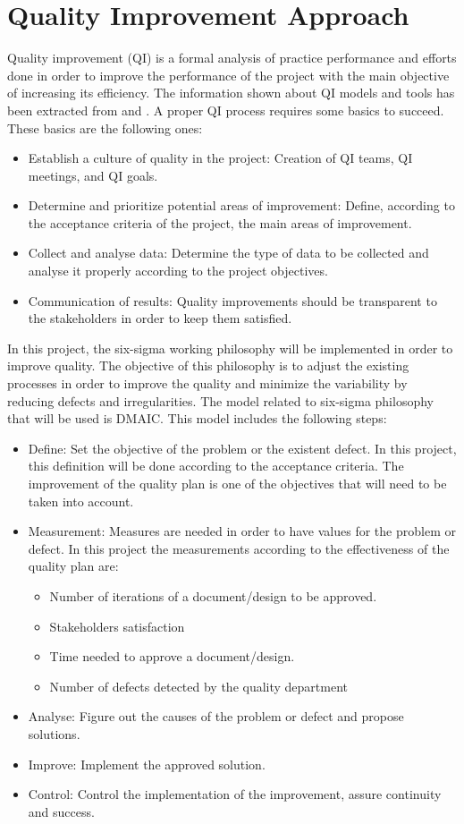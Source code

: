 \section{Quality Improvement Approach}

Quality improvement (QI) is a formal analysis of practice performance and efforts done in order to improve the performance of the project with the main objective of increasing its efficiency. The information shown about QI models and tools has been extracted from \cite{aafp} and \cite{leansolutions}. A proper QI process requires some basics to succeed. These basics are the following ones:

\begin{itemize}
	\item Establish a culture of quality in the project: Creation of QI teams, QI meetings, and QI goals.
	\item Determine and prioritize potential areas of improvement: Define, according to the acceptance criteria of the project, the main areas of improvement.
	\item Collect and analyse data: Determine the type of data to be collected and analyse it properly according to the project objectives.
	\item Communication of results: Quality improvements should be transparent to the stakeholders in order to keep them satisfied. 
\end{itemize}

In this project, the six-sigma working philosophy will be implemented in order to improve quality. The objective of this philosophy is to adjust the existing processes in order to improve the quality and minimize the variability by reducing defects and irregularities. The model related to six-sigma philosophy that will be used is DMAIC. This model includes the following steps:

\begin{itemize}
	\item Define: Set the objective of the problem or the existent defect. In this project, this definition will be done according to the acceptance criteria. The improvement of the quality plan is one of the objectives that will need to be taken into account.
	\item Measurement: Measures are needed in order to have values for the problem or defect. In this project the measurements according to the effectiveness of the quality plan are:
	\begin{itemize}
		\item Number of iterations of a document/design to be approved.
		\item Stakeholders satisfaction
		\item Time needed to approve a document/design.
		\item Number of defects detected by the quality department 
	\end{itemize}
	\item Analyse: Figure out the causes of the problem or defect and propose solutions.
	\item Improve: Implement the approved solution.
	\item Control: Control the implementation of the improvement, assure continuity and success.
\end{itemize}
